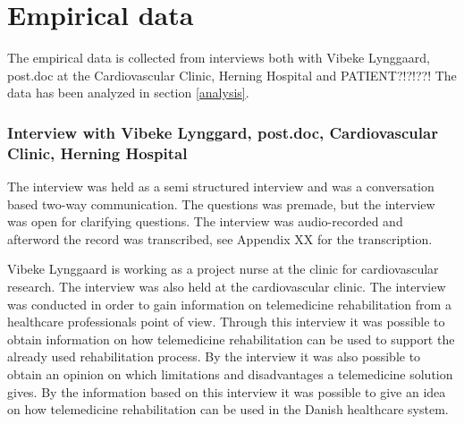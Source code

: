 \chapter{Empirical data}
\label{empirical}


The empirical data is collected from interviews both with Vibeke Lynggaard, post.doc at the Cardiovascular Clinic, Herning Hospital and PATIENT?!?!??! The data has been analyzed in section \ref{analysis}. 

\subsection{Interview with Vibeke Lynggard, post.doc, Cardiovascular Clinic, Herning Hospital}
The interview was held as a semi structured interview and was a conversation based two-way communication. The questions was premade, but the interview was open for clarifying questions. The interview was audio-recorded and afterword the record was transcribed, see Appendix XX for the transcription.    

Vibeke Lynggaard is working as a project nurse at the clinic for cardiovascular research. The interview was also held at the cardiovascular clinic. The interview was conducted in order to gain information on telemedicine rehabilitation from a healthcare professionals point of view. Through this interview it was possible to obtain information on how telemedicine rehabilitation can be used to support the already used rehabilitation process. By the interview it was also possible to obtain an opinion on which limitations and disadvantages a telemedicine solution gives. By the information based on this interview it was possible to give an idea on how telemedicine rehabilitation can be used in the Danish healthcare system. 

